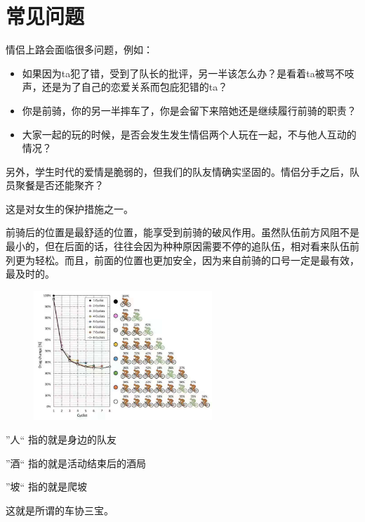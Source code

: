 \documentclass{ctexbook}
\begin{document}
\section{常见问题}
\begin{tcolorbox}[title=为什么禁止情侣上路]
    情侣上路会面临很多问题，例如：

    \begin{itemize}
        \item 如果因为ta犯了错，受到了队长的批评，另一半该怎么办？是看着ta被骂不吱声，还是为了自己的恋爱关系而包庇犯错的ta？
        \item 你是前骑，你的另一半摔车了，你是会留下来陪她还是继续履行前骑的职责？
        \item 大家一起的玩的时候，是否会发生发生情侣两个人玩在一起，不与他人互动的情况？
    \end{itemize}

    另外，学生时代的爱情是脆弱的，但我们的队友情确实坚固的。情侣分手之后，队员聚餐是否还能聚齐？
\end{tcolorbox}
\begin{tcolorbox}[title=为什么要让女生在队列前面]
    这是对女生的保护措施之一。

    前骑后的位置是最舒适的位置，能享受到前骑的破风作用。虽然队伍前方风阻不是最小的，但在后面的话，往往会因为种种原因需要不停的追队伍，相对看来队伍前列更为轻松。而且，前面的位置也更加安全，因为来自前骑的口号一定是最有效，最及时的。
       \begin{figure}[H]
            \begin{center}
            \includegraphics[width=0.6\textwidth]{fig/蹭风队形}
            \end{center}
        \end{figure}
\end{tcolorbox}
\begin{tcolorbox}[title=''人酒坡``是什么]
    ''人`` 指的就是身边的队友

    ''酒`` 指的就是活动结束后的酒局

    ''坡`` 指的就是爬坡

    这就是所谓的车协三宝。
\end{tcolorbox}
\end{document}
